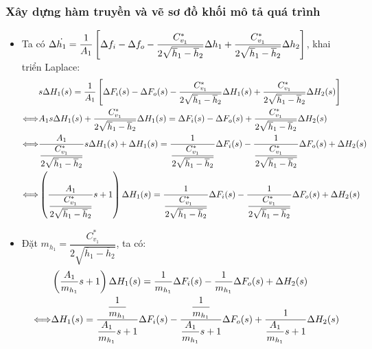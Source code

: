 \subsubsection{Xây dựng hàm truyền và vẽ sơ đồ khối mô tả quá trình}
    \begin{itemize}
        \item Ta có $\Delta \dot{h_1} = \dfrac{1}{A_1} \left[{\Delta f_i - \Delta f_o - \dfrac{C_{v_1}^{*}}{2\sqrt{\overline{h}_1 - \overline{h}_2}} \Delta h_1 + \dfrac{C_{v_1}^{*}}{2\sqrt{\overline{h}_1 - \overline{h}_2}} \Delta h_2}\right]$, khai triển Laplace:
            \begin{align*}
                & s \Delta H_1(s) = \dfrac{1}{A_1} \left[{\Delta F_i(s) - \Delta F_o (s) - \dfrac{C_{v_1}^{*}}{2\sqrt{\overline{h}_1 - \overline{h}_2}} \Delta H_1(s) + \dfrac{C_{v_1}^{*}}{2\sqrt{\overline{h}_1 - \overline{h}_2}} \Delta H_2(s)}\right]\\
                \Longleftrightarrow & A_1 s \Delta H_1(s) + \dfrac{C_{v_1}^{*}}{2\sqrt{\overline{h}_1 - \overline{h}_2}} \Delta H_1(s) = \Delta F_i(s) - \Delta F_o (s) + \dfrac{C_{v_1}^{*}}{2\sqrt{\overline{h}_1 - \overline{h}_2}} \Delta H_2(s) \\
                \Longleftrightarrow & \dfrac{A_1}{\dfrac{C_{v_1}^{*}}{2\sqrt{\overline{h}_1 - \overline{h}_2}}} s \Delta H_1(s) + \Delta H_1(s) = \dfrac{1} {\dfrac{C_{v_1}^{*}}{2\sqrt{\overline{h}_1 - \overline{h}_2}}} \Delta F_i(s) - \dfrac{1} {\dfrac{C_{v_1}^{*}}{2\sqrt{\overline{h}_1 - \overline{h}_2}}} \Delta F_o (s) + \Delta H_2(s) \\
                \Longleftrightarrow & \left({\dfrac{A_1}{\dfrac{C_{v_1}^{*}}{2\sqrt{\overline{h}_1 - \overline{h}_2}}} s + 1}\right)\Delta H_1(s) = \dfrac{1} {\dfrac{C_{v_1}^{*}}{2\sqrt{\overline{h}_1 - \overline{h}_2}}} \Delta F_i(s) - \dfrac{1} {\dfrac{C_{v_1}^{*}}{2\sqrt{\overline{h}_1 - \overline{h}_2}}} \Delta F_o (s) + \Delta H_2(s)
            \end{align*}
        \item Đặt $m_{h_1} = \dfrac{C_{v_1}^{*}}{2\sqrt{\overline{h}_1 - \overline{h}_2}}$, ta có:
            \begin{align*}
                & \pfm{\dfrac{A_1}{m_{h_1}} s + 1}\Delta H_1(s) = \dfrac{1} {m_{h_1}} \Delta F_i(s) - \dfrac{1}{m_{h_1}} \Delta F_o (s) + \Delta H_2(s) \\
                \Longleftrightarrow & \Delta H_1(s) = \dfrac{\dfrac{1} {m_{h_1}}}{\dfrac{A_1}{m_{h_1}} s + 1} \Delta F_i(s) - \dfrac{\dfrac{1}{m_{h_1}}}{\dfrac{A_1}{m_{h_1}} s + 1} \Delta F_o (s) + \dfrac{1}{\dfrac{A_1}{m_{h_1}} s + 1}\Delta H_2(s)

\end{align*}
\end{itemize}
